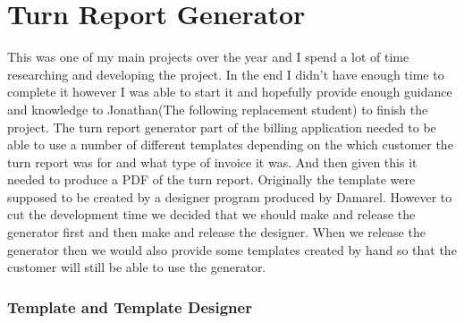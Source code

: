 \section{Turn Report Generator}{
	This was one of my main projects over the year and I spend a lot of time researching and developing the project. In the end I didn't have enough time to complete it however I was able to start it and hopefully provide enough guidance and knowledge to Jonathan(The following replacement student) to finish the project. The turn report generator part of the billing application needed to be able to use a number of different templates depending on the which customer the turn report was for and what type of invoice it was. And then given this it needed to produce a PDF of the turn report. Originally the template were supposed to be created by a designer program produced by Damarel. However to cut the development time we decided that we should make and release the generator first and then make and release the designer. When we release the generator then we would also provide some templates created by hand so that the customer will still be able to use the generator.
	\subsubsection*{Template and Template Designer}
}